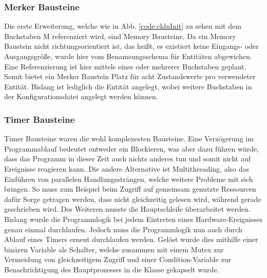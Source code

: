 \subsubsection{Merker Bausteine}\label{kap:ums:memorychannel}
Die erste Erweiterung, welche wie in Abb. \ref{code:chlnInit} zu sehen mit dem Buchstaben M referenziert wird, sind Memory Bausteine. Da ein Memory Baustein nicht richtungsorientiert ist, das heißt, es existiert keine Eingangs- oder Ausgangsgröße, wurde hier vom Benamsungsschema für Entitäten  abgewichen. Eine Referenzierung ist hier mittels eines oder mehrerer Buchstaben geplant. Somit bietet ein Merker Baustein Platz für acht Zustandswerte pro verwendeter Entität. Bislang ist lediglich die Entität  angelegt, wobei weitere Buchstaben in der Konfigurationsdatei angelegt werden können.

\subsubsection{Timer Bausteine}\label{kap:ums:timerchannel}
Timer Bausteine waren die wohl komplexesten Bausteine. Eine Verzögerung im Programmablauf bedeutet entweder ein Blockieren, was aber dazu führen würde, dass das Programm in dieser Zeit auch nichts anderes tun und somit nicht auf Ereignisse reagieren kann. Die andere Alternative ist Multithreading, also das Einführen von parallelen Handlungssträngen, welche weitere Probleme mit sich bringen. So muss zum Beispiel beim Zugriff auf gemeinsam genutzte Ressourcen dafür Sorge getragen werden, dass nicht gleichzeitig gelesen wird, während gerade geschrieben wird. Des Weiteren musste die Hauptschleife überarbeitet werden. Bislang wurde die Programmlogik bei jedem Eintreten eines Hardware-Ereignisses genau einmal durchlaufen. Jedoch muss die Programmlogik nun auch durch Ablauf eines Timers erneut durchlaufen werden. Gelöst wurde dies mithilfe einer binären Variable als Schalter, welche zusammen mit einem Mutex zur Vermeidung von gleichzeitigem Zugriff und einer Condition-Variable zur Benachrichtigung des Hauptprozesses in die Klasse  gekapselt wurde. 
